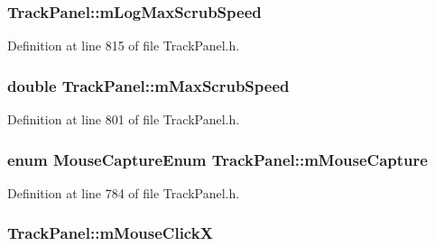 \subsubsection[{\texorpdfstring{m\+Log\+Max\+Scrub\+Speed}{mLogMaxScrubSpeed}}]{ Track\+Panel\+::m\+Log\+Max\+Scrub\+Speed\hspace{0.3cm}{\ttfamily [protected]}}\hypertarget{class_track_panel_a8588a9e934cd4cf2933b446c8eae5679}{}\label{class_track_panel_a8588a9e934cd4cf2933b446c8eae5679}


Definition at line 815 of file Track\+Panel.\+h.

\subsubsection[{\texorpdfstring{m\+Max\+Scrub\+Speed}{mMaxScrubSpeed}}]{\setlength{\rightskip}{0pt plus 5cm}double Track\+Panel\+::m\+Max\+Scrub\+Speed\hspace{0.3cm}{\ttfamily [protected]}}\hypertarget{class_track_panel_a7e5d55b49f7c2012e9157964c9d3e67f}{}\label{class_track_panel_a7e5d55b49f7c2012e9157964c9d3e67f}


Definition at line 801 of file Track\+Panel.\+h.

\subsubsection[{\texorpdfstring{m\+Mouse\+Capture}{mMouseCapture}}]{\setlength{\rightskip}{0pt plus 5cm}enum {\bf Mouse\+Capture\+Enum} Track\+Panel\+::m\+Mouse\+Capture\hspace{0.3cm}{\ttfamily [protected]}}\hypertarget{class_track_panel_a79906d0aaa8d91b2be89d479e78ec4e3}{}\label{class_track_panel_a79906d0aaa8d91b2be89d479e78ec4e3}


Definition at line 784 of file Track\+Panel.\+h.

\subsubsection[{\texorpdfstring{m\+Mouse\+ClickX}{mMouseClickX}}]{ Track\+Panel\+::m\+Mouse\+ClickX\hspace{0.3cm}{\ttfamily [protected]}}\hypertarget{class_track_panel_ad1b0688c67fc8193b1424ebf050ca138}{}\label{class_track_panel_ad1b0688c67fc8193b1424ebf050ca138}


